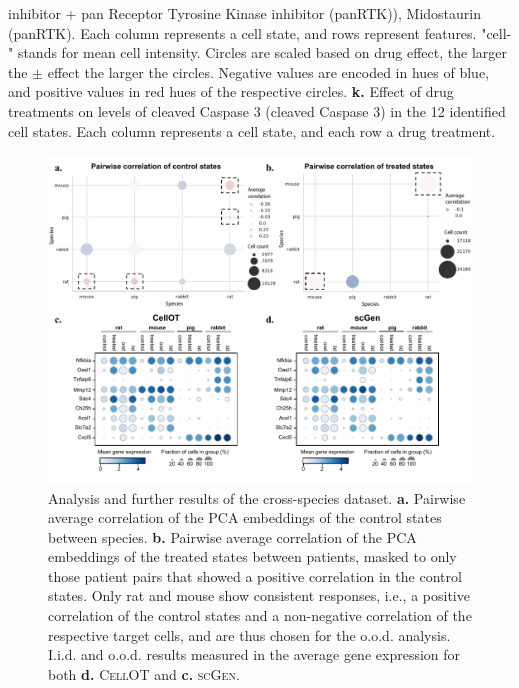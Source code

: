 {inhibitor + pan Receptor Tyrosine Kinase inhibitor (panRTK)), Midostaurin (panRTK). Each column represents a cell state, and rows represent features. "cell-" stands for mean cell intensity. Circles are scaled based on drug effect, the larger the $\pm$ effect the larger the circles. Negative values are encoded in hues of blue, and positive values in red hues of the respective circles. \textbf{k.} Effect of drug treatments on levels of cleaved Caspase 3 (cleaved Caspase 3) in the 12 identified cell states. Each column represents a cell state, and each row a drug treatment.}
\label{fig:4i_analysis_extended}

\newpage
\begin{figure}[p]
     \centering
     \includegraphics[width=\textwidth]{figures/fig_crossspecies_ood_analysis.pdf}
     \caption{ Analysis and further results of the cross-species dataset. \textbf{a.} Pairwise average correlation of the PCA embeddings of the control states between species. \textbf{b.} Pairwise average correlation of the PCA embeddings of the treated states between patients, masked to only those patient pairs that showed a positive correlation in the control states. Only rat and mouse show consistent responses, i.e., a positive correlation of the control states and a non-negative correlation of the respective target cells, and are thus chosen for the o.o.d. analysis. I.i.d. and o.o.d. results measured in the average gene expression for both \textbf{d.} \textsc{CellOT} and \textbf{c.} \textsc{scGen}.}
     \label{fig:crossspecies_ood_analysis}
\end{figure}

